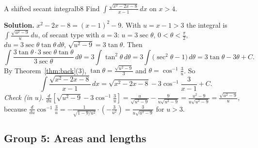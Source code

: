 \documentclass[11pt]{article}
\begin{document}
\begin{exmp}{A shifted secant integral}{b8}
Find $\int\frac{\sqrt{x^2-2x-8}}{x-1}\,dx$ on $x>4$.

\textbf{Solution.} $x^2-2x-8=(x-1)^2-9$. With $u=x-1>3$ the integral is $\int\frac{\sqrt{u^2-9}}u\,du$, of secant type with $a=3$: $u=3\sec\theta$, $0<\theta<\frac\pi2$, $du=3\sec\theta\tan\theta\,d\theta$, $\sqrt{u^2-9}=3\tan\theta$. Then
\[\int\frac{3\tan\theta\cdot3\sec\theta\tan\theta}{3\sec\theta}\,d\theta=3\int\tan^2\theta\,d\theta=3\int\big(\sec^2\theta-1\big)\,d\theta=3\tan\theta-3\theta+C .\]
By Theorem~\ref{thm:back}(3), $\tan\theta=\frac{\sqrt{u^2-9}}3$ and $\theta=\cos^{-1}\frac3u$. So
\[\int\frac{\sqrt{x^2-2x-8}}{x-1}\,dx=\sqrt{x^2-2x-8}-3\cos^{-1}\frac3{x-1}+C .\]
\emph{Check (in $u$).} $\frac{d}{du}\left[\sqrt{u^2-9}-3\cos^{-1}\frac3u\right]=\frac u{\sqrt{u^2-9}}-\frac{9}{u\sqrt{u^2-9}}=\frac{u^2-9}{u\sqrt{u^2-9}}=\frac{\sqrt{u^2-9}}u$, because $\frac d{du}\cos^{-1}\frac3u=-\frac1{\sqrt{1-9/u^2}}\cdot\left(-\frac3{u^2}\right)=\frac3{u\sqrt{u^2-9}}$ for $u>3$.
\end{exmp}

\subsection*{Group 5: Areas and lengths}
\end{document}

